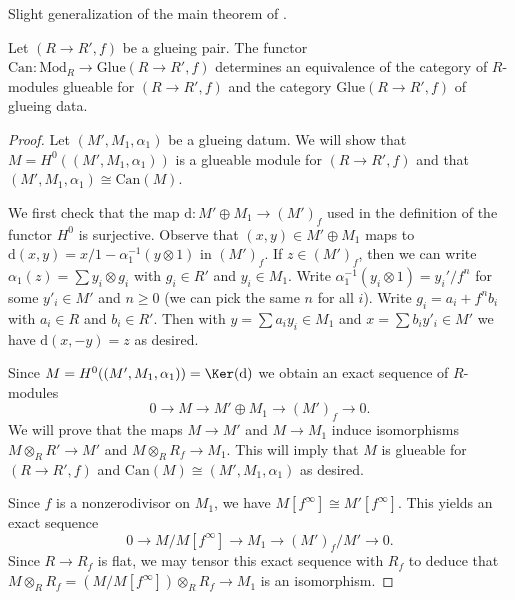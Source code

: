 \begin{theorem}
\label{theorem-BL-glueing}
\begin{reference}
Slight generalization of the main theorem of \cite{Beauville-Laszlo}.
\end{reference}
Let $(R \to R',f)$ be a glueing pair. The functor
$\text{Can} : \text{Mod}_R \longrightarrow \text{Glue}(R \to R', f)$
determines an equivalence of the category of $R$-modules glueable
for $(R \to R', f)$ and the category $\text{Glue}(R \to R', f)$
of glueing data.
\end{theorem}

\begin{proof}
Let $(M', M_1, \alpha_1)$ be a glueing datum. We will show that
$M = H^0((M', M_1, \alpha_1))$ is a glueable module for $(R \to R', f)$
and that $(M', M_1, \alpha_1) \cong \text{Can}(M)$.

\medskip\noindent
We first check that the map $\text{d} : M' \oplus M_1 \to (M')_f$ used in the
definition of the functor $H^0$ is surjective. Observe that
$(x, y) \in M' \oplus M_1$ maps to
$\text{d}(x, y) = x/1 - \alpha_1^{-1}(y \otimes 1)$
in $(M')_f$. If $z \in (M')_f$, then we can write
$\alpha_1(z) = \sum y_i \otimes g_i$ with $g_i \in R'$
and $y_i \in M_1$. Write $\alpha_1^{-1}(y_i \otimes 1) = y_i'/f^n$
for some $y'_i \in M'$ and $n \geq 0$ (we can pick the same $n$
for all $i$). Write $g_i = a_i + f^n b_i$ with $a_i \in R$ and
$b_i \in R'$. Then with $y = \sum a_i y_i \in M_1$ and
$x = \sum b_i y'_i \in M'$ we have $\text{d}(x, -y) = z$
as desired.

\medskip\noindent
Since $M = H^0((M', M_1, \alpha_1)) = \Ker(\text{d})$ we obtain
an exact sequence of $R$-modules
\begin{equation}
\label{equation-define-M}
0 \to M \to M' \oplus M_1 \to (M')_f \to 0.
\end{equation}
We will prove that the maps $M \to M'$ and $M \to M_1$ induce isomorphisms
$M \otimes_R R' \to M'$ and $M \otimes_R R_f \to M_1$.
This will imply that $M$ is glueable for $(R \to R', f)$ and
$\text{Can}(M) \cong (M', M_1, \alpha_1)$ as desired.

\medskip\noindent
Since $f$ is a nonzerodivisor on $M_1$, we have
$M[f^\infty] \cong M'[f^\infty]$. This yields an exact sequence
\begin{equation}
\label{equation-exact-mod-torsion}
0 \to M/M[f^\infty] \to M_1 \to (M')_f/M' \to 0.
\end{equation}
Since $R \to R_f$ is flat, we may tensor this exact sequence with $R_f$
to deduce that $M \otimes_R R_f = (M/M[f^\infty]) \otimes_R R_f \to M_1$
is an isomorphism.


\end{proof}
